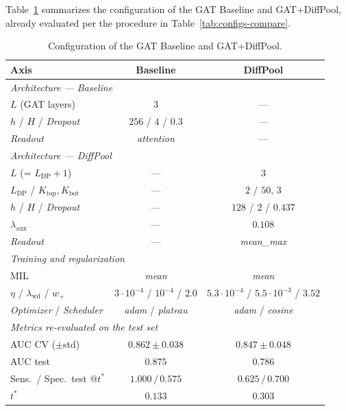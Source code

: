 \documentclass[10pt,a4paper,twocolumn,twoside]{article}
\begin{document}
Table~\ref{tab:best-params} summarizes the configuration of the GAT Baseline and GAT+DiffPool,
already evaluated per the procedure in Table~\ref{tab:configs-compare}.

\begin{table}[H]
\centering
\caption{Configuration of the GAT Baseline and GAT+DiffPool.}
\label{tab:best-params}
\small
\begin{tabular}{lcc}
\toprule
\textbf{Axis} & \textbf{Baseline} & \textbf{DiffPool} \\
\midrule
\multicolumn{3}{l}{\textit{Architecture --- Baseline}} \\[2pt]
$L$ (GAT layers)                          & $3$                      & --- \\
$h$ / $H$ / \textit{Dropout}             & $256$ / $4$ / $0.3$    & --- \\
\textit{Readout}                         & \textit{attention}       & --- \\
\midrule
\multicolumn{3}{l}{\textit{Architecture --- DiffPool}} \\[2pt]
$L$ (= $L_{\text{DP}}+1$)               & ---                      & $3$ \\
$L_{\text{DP}}$ / $K_{\text{top}},K_{\text{bot}}$ & ---           & $2$ / $50,\,3$ \\
$h$ / $H$ / \textit{Dropout}             & ---                      & $128$ / $2$ / $0.437$ \\
$\lambda_{\text{aux}}$                   & ---                      & $0.108$ \\
\textit{Readout}                         & ---                      & \textit{mean\_max} \\
\midrule
\multicolumn{3}{l}{\textit{Training and regularization}} \\[2pt]
MIL                                      & \textit{mean}            & \textit{mean} \\
$\eta$ / $\lambda_{\text{wd}}$ / $w_+$   & $3\!\cdot\!10^{-4}$ / $10^{-4}$ / $2.0$ & $5.3\!\cdot\!10^{-4}$ / $5.5\!\cdot\!10^{-3}$ / $3.52$ \\
\textit{Optimizer} / \textit{Scheduler}  & \textit{adam} / \textit{plateau} & \textit{adam} / \textit{cosine} \\
\midrule
\multicolumn{3}{l}{\textit{Metrics re-evaluated on the test set}} \\[2pt]
AUC CV ($\pm$std)                        & $0.862\!\pm\!0.038$  & $0.847\!\pm\!0.048$ \\
AUC test                                 & $\mathbf{0.875}$       & $0.786$ \\
Sens.\ / Spec.\ test @$t^*$              & $\mathbf{1.000\,/\,0.575}$ & $0.625\,/\,0.700$ \\
$t^*$                                    & $0.133$                & $0.303$ \\
\bottomrule
\end{tabular}
\end{table}
\end{document}
